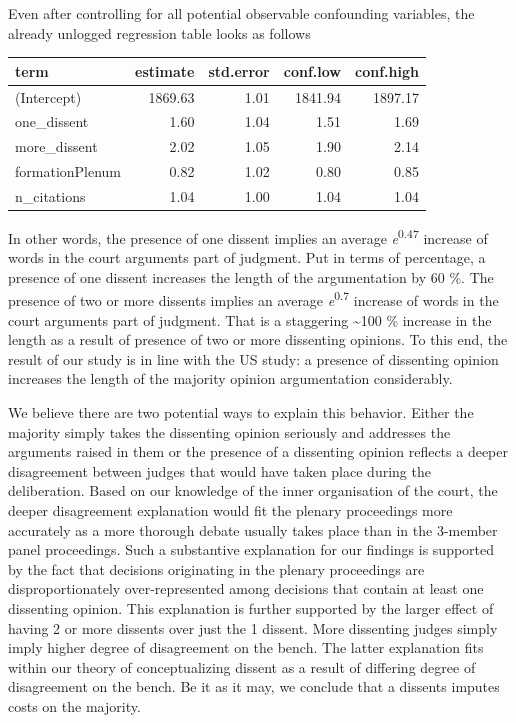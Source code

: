\documentclass[
  11pt,
]{article}
\begin{document}
Even after controlling for all potential observable confounding
variables, the already unlogged regression table looks as follows

\begin{longtable}[]{@{}lrrrr@{}}
\toprule\noalign{}
term & estimate & std.error & conf.low & conf.high \\
\midrule\noalign{}
\endhead
\bottomrule\noalign{}
\endlastfoot
(Intercept) & 1869.63 & 1.01 & 1841.94 & 1897.17 \\
one\_dissent & 1.60 & 1.04 & 1.51 & 1.69 \\
more\_dissent & 2.02 & 1.05 & 1.90 & 2.14 \\
formationPlenum & 0.82 & 1.02 & 0.80 & 0.85 \\
n\_citations & 1.04 & 1.00 & 1.04 & 1.04 \\
\end{longtable}

In other words, the presence of one dissent implies an average
\emph{e}\textsuperscript{0.47} increase of words in the court arguments
part of judgment. Put in terms of percentage, a presence of one dissent
increases the length of the argumentation by 60 \%. The presence of two
or more dissents implies an average \emph{e}\textsuperscript{0.7}
increase of words in the court arguments part of judgment. That is a
staggering \textasciitilde100 \% increase in the length as a result of
presence of two or more dissenting opinions. To this end, the result of
our study is in line with the US study: a presence of dissenting opinion
increases the length of the majority opinion argumentation considerably.

We believe there are two potential ways to explain this behavior. Either
the majority simply takes the dissenting opinion seriously and addresses
the arguments raised in them or the presence of a dissenting opinion
reflects a deeper disagreement between judges that would have taken
place during the deliberation. Based on our knowledge of the inner
organisation of the court, the deeper disagreement explanation would fit
the plenary proceedings more accurately as a more thorough debate
usually takes place than in the 3-member panel proceedings. Such a
substantive explanation for our findings is supported by the fact that
decisions originating in the plenary proceedings are disproportionately
over-represented among decisions that contain at least one dissenting
opinion. This explanation is further supported by the larger effect of
having 2 or more dissents over just the 1 dissent. More dissenting
judges simply imply higher degree of disagreement on the bench. The
latter explanation fits within our theory of conceptualizing dissent as
a result of differing degree of disagreement on the bench. Be it as it
may, we conclude that a dissents imputes costs on the majority.
\end{document}
